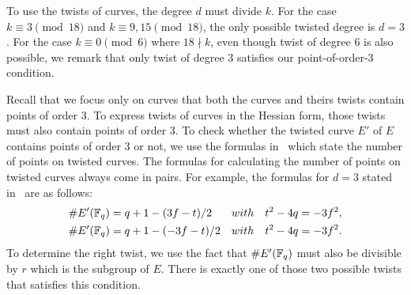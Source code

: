 To use the twists of curves, the degree $d$ must divide $k$.
For the case $k \equiv 3 \pmod{18}$ and $k \equiv 9,15 \pmod{18}$,
the only possible twisted degree is $d = 3$.
For the case $k \equiv 0 \pmod{6}$ where $18 \nmid k$,
even though twist of degree 6 is also possible,
we remark that only twist of degree $3$ satisfies our point-of-order-3 condition.

Recall that we focus only on curves that both the curves and theirs twists contain points of order 3.
To express twists of curves in the Hessian form,
those twists must also contain points of order 3.
To check whether the twisted curve $E'$ of $E$ contains points of order 3 or not,
we use the formulas in~\cite{2006/hess} which state the number of points on twisted curves.
The formulas for calculating the number of points on twisted curves always come in pairs.
For example, the formulas for $d = 3$ stated in~\cite{2006/hess} are as follows:
\begin{align*}
\# E' (\mathbb{F}_{q}) &= q + 1 - (3f - t) / 2 & with & \quad t^2 - 4q = -3f^2, \\
\# E' (\mathbb{F}_{q}) &= q + 1 - (-3f- t) / 2 & with & \quad t^2 - 4q = -3f^2.
\end{align*}
To determine the right twist,
we use the fact that $\#E'(\mathbb{F}_{q})$ must also be divisible by $r$ which is the subgroup of $E$.
There is exactly one of those two possible twists that satisfies this condition.



